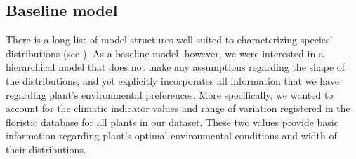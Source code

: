 \documentclass[11pt, a4paper]{article}
\begin{document}
\subsection*{Baseline model}
There is a long list of model structures well suited to characterizing species' distributions (see \citealt{norbergComprehensiveEvaluationPredictive2019}). As a baseline model, however, we were interested in a hierarchical model that does not make any assumptions regarding the shape of the distributions, and yet explicitly incorporates all information that we have regarding plant's environmental preferences. More specifically, we wanted to account for the climatic indicator values and range of variation registered in the floristic database for all plants in our dataset. These two values provide basic information regarding plant's optimal environmental conditions and width of their distributions.
\end{document}
